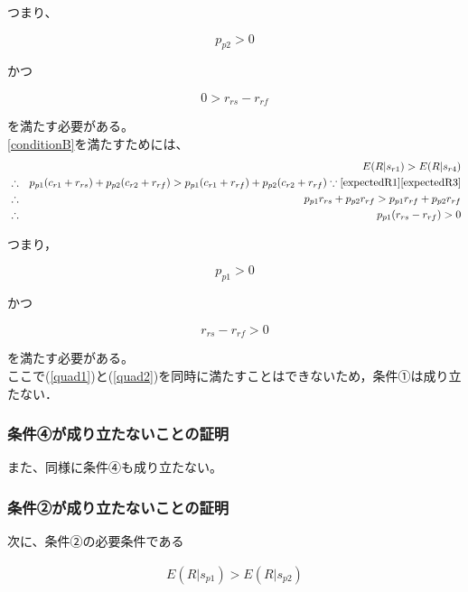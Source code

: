 つまり、

\begin{equation}
  p_{p2} > 0 \nonumber
\end{equation}

かつ

\begin{equation}
\label{quad1}
  0 > r_{rs} - r_{rf}
\end{equation}

を満たす必要がある。\\


\eqref{conditionB}を満たすためには、
\begin{eqnarray*}
  &&E(R|s_{r1}) > E(R|s_{r4}) \\
  &\therefore& p_{p1} (c_{r1} + r_{rs}) + p_{p2} (c_{r2} + r_{rf}) > p_{p1} (c_{r1} + r_{rf}) + p_{p2} (c_{r2} + r_{rf}) \because\eqref{expectedR1}\eqref{expectedR3}\\
  &\therefore& p_{p1} r_{rs} + p_{p2} r_{rf} > p_{p1} r_{rf} + p_{p2} r_{rf} \\
  &\therefore& p_{p1} (r_{rs} - r_{rf}) > 0
\end{eqnarray*}

つまり，

\begin{equation}
   p_{p1} > 0 \nonumber
\end{equation}

かつ

\begin{equation}
   \label{quad2}
   r_{rs} - r_{rf} > 0
\end{equation}

を満たす必要がある。\\

ここで(\ref{quad1})と(\ref{quad2})を同時に満たすことはできないため，条件①は成り立たない．\\

\subsubsection{条件④が成り立たないことの証明}
また、同様に条件④も成り立たない。

\subsubsection{条件②が成り立たないことの証明}
次に、条件②の必要条件である

\begin{gather}
  E(R |s_{p1}) > E(R |s_{p2}) \label{conditionC}
\end{gather}

